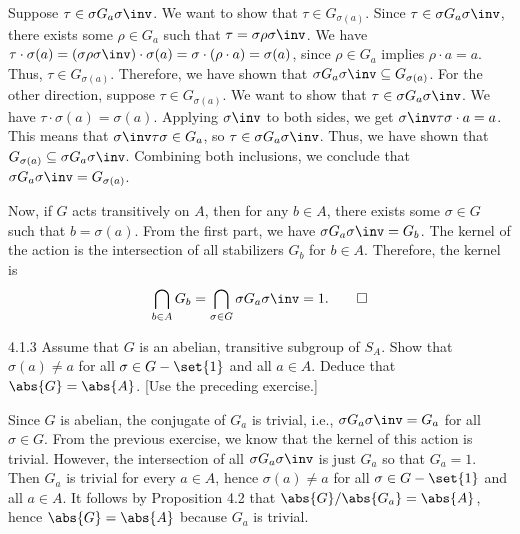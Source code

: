 \begin{sol}
	Suppose $\tau \in \sigma G_a\sigma\inv$.
	We want to show that $\tau \in G_{\sigma(a)}$.
	Since $\tau \in \sigma G_a \sigma\inv$, there exists some $\rho \in G_a$ such that $\tau = \sigma \rho \sigma\inv$.
	We have $\tau \cdot \sigma(a) = (\sigma \rho \sigma\inv) \cdot \sigma(a) = \sigma \cdot (\rho \cdot a) = \sigma(a)$, since $\rho \in G_a$ implies $\rho \cdot a = a$.
	Thus, $\tau \in G_{\sigma(a)}$.
	Therefore, we have shown that \(\sigma G_a \sigma\inv \subseteq G_{\sigma(a)}\).
	For the other direction, suppose $\tau \in G_{\sigma(a)}$.
	We want to show that $\tau \in \sigma G_a \sigma\inv$.
	We have $\tau \cdot \sigma(a) = \sigma(a)$.
	Applying $\sigma\inv$ to both sides, we get $\sigma\inv \tau \sigma \cdot a = a$.
	This means that $\sigma\inv \tau \sigma \in G_a$, so $\tau \in \sigma G_a \sigma\inv$.
	Thus, we have shown that \(G_{\sigma(a)} \subseteq \sigma G_a \sigma\inv\).
	Combining both inclusions, we conclude that \(\sigma G_a \sigma\inv = G_{\sigma(a)}\).

	Now, if $G$ acts transitively on $A$, then for any $b \in A$, there exists some $\sigma \in G$ such that $b = \sigma(a)$.
	From the first part, we have \(\sigma G_a \sigma\inv = G_b\).
	The kernel of the action is the intersection of all stabilizers \(G_b\) for \(b \in A\).
	Therefore, the kernel is
	\[
		\bigcap_{b \in A} G_b = \bigcap_{\sigma \in G} \sigma G_a \sigma\inv = 1. \qedhere
	\]
\end{sol}

\begin{exercise}{4.1.3}
	Assume that $G$ is an abelian, transitive subgroup of $S_A$.
	Show that \(\sigma(a) \neq a\) for all \(\sigma \in G - \set{1}\) and all \(a \in A\).
	Deduce that \(\abs{G} = \abs{A}\). [Use the preceding exercise.]
\end{exercise}

\begin{sol}
	Since $G$ is abelian, the conjugate of $G_a$ is trivial, i.e., $\sigma G_a \sigma\inv = G_a$ for all $\sigma \in G$.
	From the previous exercise, we know that the kernel of this action is trivial.
	However, the intersection of all $\sigma G_a\sigma\inv$ is just $G_a$ so that $G_a = 1$.
	Then $G_a$ is trivial for every $a \in A$, hence $\sigma(a) \neq a$ for all $\sigma \in G - \set{1}$ and all $a \in A$.
	It follows by Proposition 4.2 that $\abs{G}/\abs{G_a} = \abs{A}$, hence $\abs{G} = \abs{A}$ because $G_a$ is trivial.
\end{sol}

